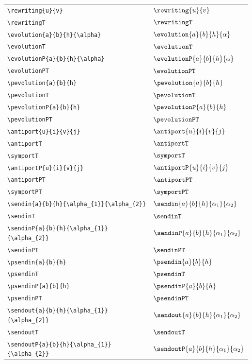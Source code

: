 \documentclass{article}
\begin{document}
{\footnotesize
\begin{longtable}{ll}
  \verb=\rewriting{u}{v}= & $\rewriting{u}{v}$ \\
  \verb=\rewritingT= & $\rewritingT$ \\
  \verb=\evolution{a}{b}{h}{\alpha}= & $\evolution{a}{b}{h}{\alpha}$ \\
  \verb=\evolutionT= & $\evolutionT$ \\
  \verb=\evolutionP{a}{b}{h}{\alpha}= & $\evolutionP{a}{b}{h}{\alpha}$ \\
  \verb=\evolutionPT= & $\evolutionPT$ \\
  \verb=\pevolution{a}{b}{h}= & $\pevolution{a}{b}{h}$ \\
  \verb=\pevolutionT= & $\pevolutionT$ \\
  \verb=\pevolutionP{a}{b}{h}= & $\pevolutionP{a}{b}{h}$ \\
  \verb=\pevolutionPT= & $\pevolutionPT$ \\
  \verb=\antiport{u}{i}{v}{j}= & $\antiport{u}{i}{v}{j}$ \\
  \verb=\antiportT= & $\antiportT$ \\
  \verb=\symportT= & $\symportT$ \\
  \verb=\antiportP{u}{i}{v}{j}= & $\antiportP{u}{i}{v}{j}$ \\
  \verb=\antiportPT= & $\antiportPT$ \\
  \verb=\symportPT= & $\symportPT$ \\
  \verb=\sendin{a}{b}{h}{\alpha_{1}}{\alpha_{2}}= & $\sendin{a}{b}{h}{\alpha_{1}}{\alpha_{2}}$ \\
  \verb=\sendinT= & $\sendinT$ \\
  \verb=\sendinP{a}{b}{h}{\alpha_{1}}{\alpha_{2}}= & $\sendinP{a}{b}{h}{\alpha_{1}}{\alpha_{2}}$ \\
  \verb=\sendinPT= & $\sendinPT$ \\
  \verb=\psendin{a}{b}{h}= & $\psendin{a}{b}{h}$ \\
  \verb=\psendinT= & $\psendinT$ \\
  \verb=\psendinP{a}{b}{h}= & $\psendinP{a}{b}{h}$ \\
  \verb=\psendinPT= & $\psendinPT$ \\
  \verb=\sendout{a}{b}{h}{\alpha_{1}}{\alpha_{2}}= & $\sendout{a}{b}{h}{\alpha_{1}}{\alpha_{2}}$ \\
  \verb=\sendoutT= & $\sendoutT$ \\
  \verb=\sendoutP{a}{b}{h}{\alpha_{1}}{\alpha_{2}}= & $\sendoutP{a}{b}{h}{\alpha_{1}}{\alpha_{2}}$ \\

\end{longtable}}
\end{document}
